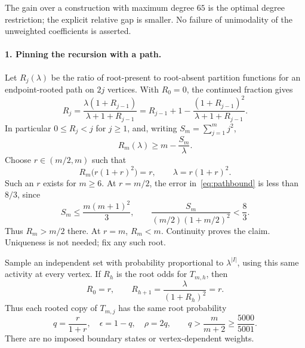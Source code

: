 \documentclass[11pt]{article}
\begin{document}
The gain over a construction with maximum degree $65$ is the optimal degree restriction; the explicit relative gap is smaller. No failure of unimodality of the unweighted coefficients is asserted.

\paragraph{1. Pinning the recursion with a path.}
Let $R_j(\lambda)$ be the ratio of root-present to root-absent partition functions for an endpoint-rooted path on $2j$ vertices. With $R_0=0$, the continued fraction gives
\begin{equation}\label{eq:path}
 R_j=\frac{\lambda(1+R_{j-1})}{\lambda+1+R_{j-1}}
 =R_{j-1}+1-\frac{(1+R_{j-1})^2}{\lambda+1+R_{j-1}}.
\end{equation}
In particular $0\le R_j<j$ for $j\ge1$, and, writing $S_m=\sum_{j=1}^m j^2$,
\begin{equation}\label{eq:pathbound}
 R_m(\lambda)\ge m-\frac{S_m}{\lambda}.
\end{equation}
Choose $r\in(m/2,m)$ such that
\begin{equation}\label{eq:pin}
 R_m\bigl(r(1+r)^2\bigr)=r,\qquad \lambda=r(1+r)^2.
\end{equation}
Such an $r$ exists for $m\ge6$. At $r=m/2$, the error in~\eqref{eq:pathbound} is less than $8/3$, since
\[
 S_m\le\frac{m(m+1)^2}{3},\qquad
 \frac{S_m}{(m/2)(1+m/2)^2}<\frac83.
\]
Thus $R_m>m/2$ there. At $r=m$, $R_m<m$. Continuity proves the claim. Uniqueness is not needed; fix any such root.

Sample an independent set with probability proportional to $\lambda^{|I|}$, using this same activity at every vertex. If $R_h$ is the root odds for $T_{m,h}$, then
\[
 R_0=r,\qquad R_{h+1}=\frac{\lambda}{(1+R_h)^2}=r.
\]
Thus each rooted copy of $T_{m,j}$ has the same root probability
\begin{equation}\label{eq:q}
 q=\frac r{1+r},\quad \epsilon=1-q,\quad \rho=2q,
 \qquad q>\frac{m}{m+2}\ge\frac{5000}{5001}.
\end{equation}
There are no imposed boundary states or vertex-dependent weights.
\end{document}
